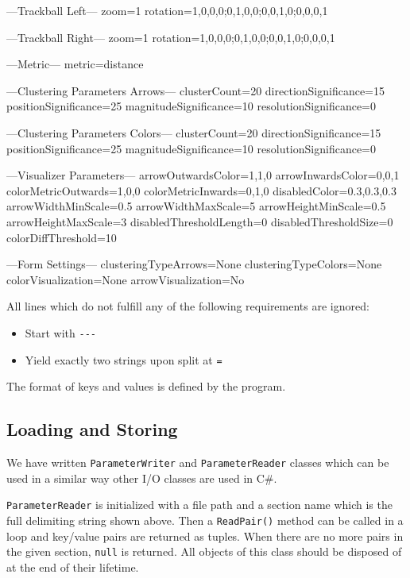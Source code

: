 \begin{code}
---Trackball Left---
zoom=1
rotation=1,0,0,0;0,1,0,0;0,0,1,0;0,0,0,1

---Trackball Right---
zoom=1
rotation=1,0,0,0;0,1,0,0;0,0,1,0;0,0,0,1

---Metric---
metric=distance

---Clustering Parameters Arrows---
clusterCount=20
directionSignificance=15
positionSignificance=25
magnitudeSignificance=10
resolutionSignificance=0

---Clustering Parameters Colors---
clusterCount=20
directionSignificance=15
positionSignificance=25
magnitudeSignificance=10
resolutionSignificance=0

---Visualizer Parameters---
arrowOutwardsColor=1,1,0
arrowInwardsColor=0,0,1
colorMetricOutwards=1,0,0
colorMetricInwards=0,1,0
disabledColor=0.3,0.3,0.3
arrowWidthMinScale=0.5
arrowWidthMaxScale=5
arrowHeightMinScale=0.5
arrowHeightMaxScale=3
disabledThresholdLength=0
disabledThresholdSize=0
colorDiffThreshold=10

---Form Settings---
clusteringTypeArrows=None
clusteringTypeColors=None
colorVisualization=None
arrowVisualization=No
\end{code}

All lines which do not fulfill any of the following requirements are ignored:

\begin{itemize}
\item Start with \verb+---+
\item Yield exactly two strings upon split at \verb+=+
\end{itemize}

The format of keys and values is defined by the program.
\subsection{Loading and Storing}
\label{attch:parameter_load_store-load_store}

We have written \verb+ParameterWriter+ and \verb+ParameterReader+ classes which can be used in a similar way other I/O classes are used in C\#.

\verb+ParameterReader+ is initialized with a file path and a section name which is the full delimiting string shown above. Then a \verb+ReadPair()+ method can be called in a loop and key/value pairs are returned as tuples. When there are no more pairs in the given section, \verb+null+ is returned. All objects of this class should be disposed of at the end of their lifetime.

